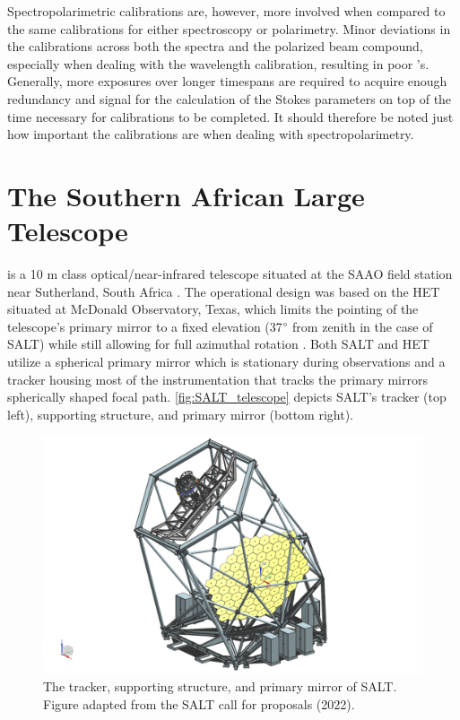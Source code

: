 Spectropolarimetric calibrations are, however, more involved when compared to the same calibrations for either spectroscopy or polarimetry. Minor deviations in the calibrations across both the spectra and the polarized beam compound, especially when dealing with the wavelength calibration, resulting in poor 's. Generally, more exposures over longer timespans are required to acquire enough redundancy and signal for the calculation of the Stokes parameters on top of the time necessary for calibrations to be completed. It should therefore be noted just how important the calibrations are when dealing with spectropolarimetry.

\section{The Southern African Large Telescope} \label{sec:SALT} %

 is a 10 m class optical/near-infrared telescope situated at the \gls{SAAO} field station near Sutherland, South Africa \citep{SALT_optical_design}. The operational design was based on the \gls{HET} situated at McDonald Observatory, Texas, which limits the pointing of the telescope's primary mirror to a fixed elevation (37$\degree$ from zenith in the case of SALT) while still allowing for full azimuthal rotation \citep{HET}. Both SALT and HET utilize a spherical primary mirror which is stationary during observations and a tracker housing most of the instrumentation that tracks the primary mirrors spherically shaped focal path. \autoref{fig:SALT_telescope} depicts \gls{SALT}'s tracker (top left), supporting structure, and primary mirror (bottom right).

\begin{figure}[t]
    \centering
    \includegraphics[width = 15cm]{figures/2_SALT_telescope.png}
    \caption{The tracker, supporting structure, and primary mirror of SALT. Figure adapted from the SALT call for proposals (2022).\protect\footnotemark}
    \label{fig:SALT_telescope}
\end{figure}


